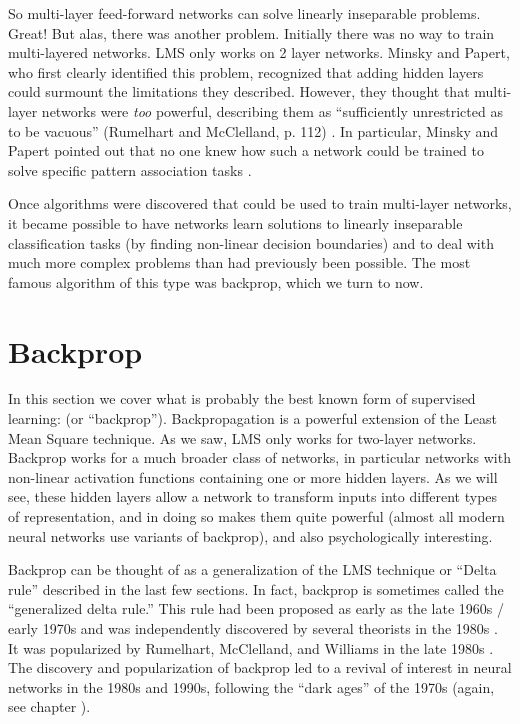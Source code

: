 So multi-layer feed-forward networks can solve linearly inseparable problems. Great!  But alas, there was another  problem. Initially there was no way to train multi-layered networks. LMS only works on 2 layer networks. Minsky and Papert, who first clearly identified this problem, recognized that adding hidden layers could surmount the limitations they described. However, they thought that multi-layer networks were {\em too} powerful, describing them as ``sufficiently unrestricted as to be vacuous'' (Rumelhart and McClelland, p. 112) \cite{rumelhart1986parallel}. In particular, Minsky and Papert pointed out that no one knew how such a network could be trained to solve specific pattern association tasks \cite{minsky1969perceptrons}.

Once algorithms were discovered that could be used to train multi-layer networks, it became possible to have networks learn solutions to linearly inseparable classification tasks (by finding non-linear decision boundaries) and to deal with much more complex problems than had previously been possible. The most famous algorithm of this type was backprop, which we turn to now.

\section{Backprop}\label{backprop}

In this section we cover what is probably the best known form of supervised learning:  (or ``backprop''). Backpropagation is a powerful extension of the Least Mean Square  technique. As we saw, LMS only works for two-layer networks. Backprop works for a much broader class of networks, in particular networks with non-linear activation functions containing one or more hidden layers. As we will see, these hidden layers allow a network to transform inputs into different types of representation, and in doing so makes them quite powerful (almost all modern neural networks use variants of backprop), and also psychologically interesting. 

Backprop can be thought of as a generalization of the LMS technique or ``Delta rule'' described in the last few sections. In fact, backprop is sometimes called the ``generalized delta rule.'' This rule had been proposed as early as the late 1960s / early 1970s \cite{bryson1969applied, werbos1974beyond} and was independently discovered by several theorists in the 1980s \cite{le1986learning, parker1985learning}. It was popularized by Rumelhart, McClelland, and Williams in the late 1980s \cite{rumelhart1986parallel}. The discovery and popularization of backprop led to a revival of interest in neural networks in the 1980s and 1990s, following the ``dark ages'' of the 1970s (again, see chapter ).

